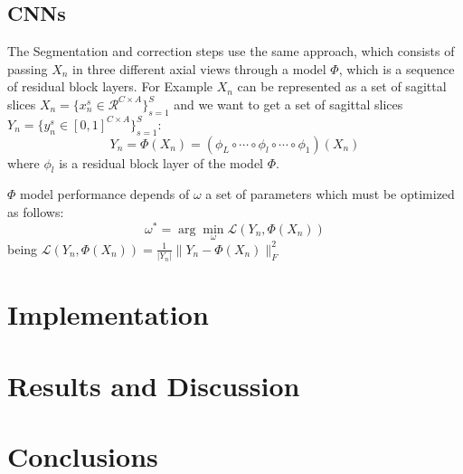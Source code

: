 \documentclass{elsarticle}
\begin{document}
\subsection{CNNs}
The Segmentation and correction steps use the same approach, which consists of
passing $X_n$ in three different axial views through a model $\Phi$, which is a
sequence of residual block layers. For Example $X_n$ can be represented as a set
of sagittal slices $X_n = \{x_n^s \in \mathcal{R}^{C \times A}\}_{s=1}^S$ and we
want to get a set of sagittal slices $Y_n = \{y_n^s \in [0, 1]^{C \times
A}\}_{s=1}^S$:
\begin{equation}
    Y_n = \Phi(X_n) = (\phi_L \circ \cdots \circ \phi_l \circ \cdots \circ
    \phi_1)(X_n)
\end{equation}
where $\phi_l$ is a residual block layer of the model $\Phi$.\par

$\Phi$ model performance depends of $\omega$ a set of parameters which must be
optimized as follows:
\begin{equation}
    \omega^* = \arg \min_{\omega} \mathcal{L}(Y_n, \Phi(X_n))
\end{equation}
being $\mathcal{L}(Y_n, \Phi(X_n)) = \frac{1}{|Y_n|} \| Y_n - \Phi(X_n)\|_F^2$ 

\section{Implementation}
\section{Results and Discussion}
\section{Conclusions}
\end{document}
